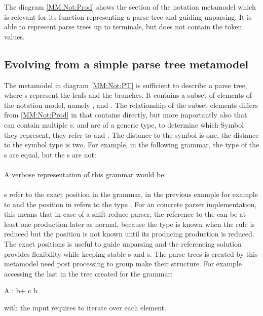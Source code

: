 The diagram \ref{MM:Not:Prod} shows the section of the notation metamodel which is relevant for its function representing a parse tree and guiding unparsing. It is able to represent parse trees up to terminals, but does not contain the token values.\\

\subsection{Evolving from a simple parse tree metamodel}The metamodel in diagram \ref{MM:Not:PT} is sufficient to describe a parse tree, where s represent the leafs and  the branches. It contains a subset of elements of the notation model, namely ,  and . The relationship of the subset elements differs from \ref{MM:Not:Prod} in that  contains  directly, but more importantly also that  can contain multiple s.  and  are of a generic type, to determine which Symbol they represent, they refer to  and . The distance to the symbol is one, the distance to the symbol type is two. 
For example, in the following grammar, the type of the s are equal, but the s are not:\\
 \\
A verbose representation of this grammar would be: \\
 \\
s refer to the exact position in the grammar, in the previous example for example to  and the position in refers to the type . For an concrete parser implementation, this means that in case of a shift reduce parser, the reference to the  can be at least one production later as normal, because the type is known when the rule is reduced but the position is not known until its producing production is reduced. The exact positions is useful to guide unparsing and the referencing solution provides flexibility while keeping stable s and s. The parse trees is created by this metamodel need post processing to group make their structure. For example accessing the last  in the tree created for the grammar:\\
\begin{xtxt}
A : b+ c b 
\end{xtxt}
with the input  requires to iterate over each element. 

